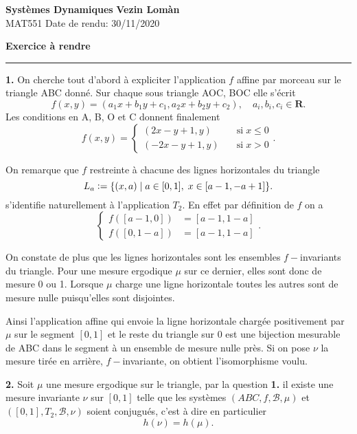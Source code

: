 \documentclass[12pt]{article}
\newcommand{\defeq}{\vcentcolon=}
\newcommand{\R}{\mathbf{R}}
\begin{document}
        \noindent
\textbf{Systèmes Dynamiques} \hfill \textbf{Vezin Lomàn}\\
\normalsize MAT551 \hfill Date de rendu: 30/11/2020\\

\begin{center}
\textbf{Exercice à rendre}
\end{center}

\bigskip
\hrule
\bigskip

\textbf{1.} On cherche tout d'abord à expliciter l'application $f$ affine par morceau sur le triangle ABC donné. Sur chaque sous triangle AOC, BOC elle s'écrit  \[
        f(x,y) = (a_{1}x + b_{1}y +c_{1}, a_{2}x + b_{2}y +c_{2}), \quad a_{i}, b_{i}, c_{i} \in \R
.\] Les conditions en A, B, O et C donnent finalement \[
        f(x,y) = \begin{cases}
                (2x-y+1, y) \quad &\text{si} \; x \le 0 \\
                (-2x-y+1,y) \quad &\text{si} \; x > 0
        \end{cases} 
.\]

On remarque que $f$ restreinte à chacune des lignes horizontales du triangle \[
L_{a} \defeq \{(x,a) \;|\; a \in [0,1], \; x \in [a-1,-a+1]\}
.\] s'identifie naturellement à l'application $T_{2}$. En effet par définition de $f$ on a 
\[
        \begin{cases}
                f([a-1,0]) &= [a-1,1-a] \\
                f([0,1-a]) &= [a-1,1-a]
        \end{cases}
.\] 
        
On constate de plus que les lignes horizontales sont les ensembles $f-$invariants du triangle. Pour une mesure ergodique $\mu$ sur ce dernier, elles sont donc de mesure 0 ou 1. Lorsque $\mu$ charge une ligne horizontale toutes les autres sont de mesure nulle puisqu'elles sont disjointes.

Ainsi l'application affine qui envoie la ligne horizontale chargée positivement par $\mu$ sur le segment $[0,1]$ et le reste du triangle sur 0 est une bijection mesurable de ABC dans le segment à un ensemble de mesure nulle près. Si on pose $\nu$ la mesure tirée en arrière, $f-$invariante, on obtient l'isomorphisme voulu.

\bigskip

\textbf{2.} Soit $\mu$ une mesure ergodique sur le triangle, par la question \textbf{1.} il existe une mesure invariante $\nu$ sur $[0,1]$ telle que les systèmes $(ABC,f,\mathcal{B},\mu)$ et $([0,1],T_{2},\mathcal{B},\nu)$ soient conjugués, c'est à dire en particulier \[
        h(\nu) = h(\mu)
.\]
\end{document}
